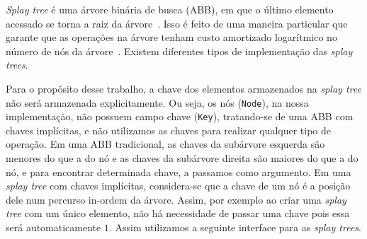\emph{Splay tree} é uma árvore binária de busca (ABB), em que o último elemento acessado 
se torna a raiz da árvore~\cite{SleatorT1985}. Isso é feito de uma maneira particular 
que garante que as operações na árvore tenham custo amortizado logarítmico no número de 
nós da árvore~\cite{SedgewickW2011}. Existem diferentes tipos de implementação das \emph{splay trees}.  

Para o propósito desse trabalho, a chave dos elementos armazenados na \emph{splay tree} não será armazenada explicitamente. Ou seja, os nós (\texttt{Node}), na nossa implementação, não possuem campo chave (\texttt{Key}), tratando-se de uma ABB com chaves implícitas, e não utilizamos as chaves para realizar qualquer tipo de operação. Em uma ABB tradicional, as chaves da subárvore esquerda são menores do que a do nó e as chaves da subárvore direita são maiores do que a do nó, e para encontrar determinada chave, a passamos como argumento. Em uma \emph{splay tree} com chaves implícitas, considera-se que a chave de um nó é a posição dele num percurso in-ordem da árvore. Assim, por exemplo ao criar uma \emph{splay tree} com um único elemento, não há necessidade de passar uma chave pois essa será automaticamente $1$. Assim utilizamos a seguinte interface para as \emph{splay trees}.  


